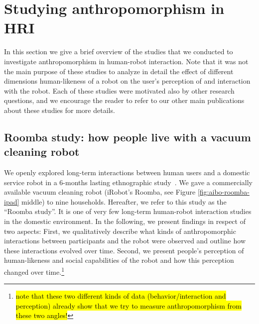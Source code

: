 \documentclass{frontiersSCNS} %
\begin{document}
%
%
%
%
%
%

\section{Studying anthropomorphism in HRI}
\label{sec:overview-studies}

In this section we give a brief overview of the studies that we conducted to
investigate anthropomorphism in human-robot interaction. Note that it was not
the main purpose of these studies to analyze in detail the effect of different
dimensions human-likeness of a robot on the user's perception of and interaction
with the robot. Each of these studies were motivated also by other research
questions, and we encourage the reader to refer to our other main publications
about these studies for more details.


\subsection{Roomba study: how people live with a vacuum cleaning robot}

We openly explored long-term interactions between human users and a domestic
service robot in a 6-months lasting ethnographic study~\citep{fink_living_2013}. 
We gave a commercially
available vacuum cleaning robot (iRobot's Roomba, see Figure
\ref{fig:aibo-roomba-ipad} middle) to nine households. 
Hereafter, we refer to this study as the ``Roomba study''. It is one of very few 
long-term human-robot interaction studies in the domestic environment. 
In the following, we present findings in respect of two aspects: First, we
qualitatively describe what kinds of anthropomorphic interactions between
participants and the robot were observed and outline how these interactions
evolved over time.  Second, we present people's perception of human-likeness and
social capabilities of the robot and how this perception changed over
time.\footnote{\hl{note that these two different kinds of data
(behavior/interaction and perception) already show that we try to measure
anthropomorphism from these two angles!}}
\end{document}
